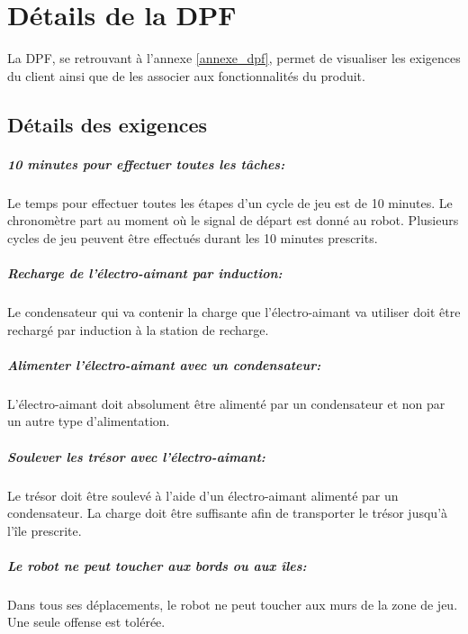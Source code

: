 \chapter{Détails de la DPF}
La DPF, se retrouvant à l'annexe \ref{annexe_dpf}, permet de visualiser les exigences du client ainsi que de les associer aux fonctionnalités du produit.

\section{Détails des exigences}

\paragraph{10 minutes pour effectuer toutes les tâches:}
Le temps pour effectuer toutes les étapes d'un cycle de jeu est de 10 minutes. Le chronomètre part au moment où le signal de départ est donné au robot.
Plusieurs cycles de jeu peuvent être effectués durant les 10 minutes prescrits.

\paragraph{Recharge de l'électro-aimant par induction:}
Le condensateur qui va contenir la charge que l'électro-aimant va utiliser doit être rechargé par induction à la station de recharge.

\paragraph{Alimenter l'électro-aimant avec un condensateur:}
L'électro-aimant doit absolument être alimenté par un condensateur et non par un autre type d'alimentation.

\paragraph{Soulever les trésor avec l'électro-aimant:}
Le trésor doit être soulevé à l'aide d'un électro-aimant alimenté par un condensateur. La charge doit être suffisante afin de transporter le trésor jusqu'à l'île prescrite.

\paragraph{Le robot ne peut toucher aux bords ou aux îles:}
Dans tous ses déplacements, le robot ne peut toucher aux murs de la zone de jeu. Une seule offense est tolérée.

